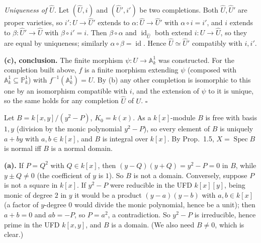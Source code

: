 \documentclass[11pt]{article}
\begin{document}
\emph{Uniqueness of $\hat U$.} Let $(\hat U,i)$ and $(\hat U',i')$ be two completions. Both $\hat U,\hat U'$ are proper varieties, so $i':U\to\hat U'$ extends to $\alpha:\hat U\to\hat U'$ with $\alpha\circ i=i'$, and $i$ extends to $\beta:\hat U'\to\hat U$ with $\beta\circ i'=i$. Then $\beta\circ\alpha$ and $\operatorname{id}_{\hat U}$ both extend $i:U\to\hat U$, so they are equal by uniqueness; similarly $\alpha\circ\beta=\operatorname{id}$. Hence $\hat U\simeq\hat U'$ compatibly with $i,i'$.

\textbf{(c), conclusion.} The finite morphism $\psi:U\to\mathbb A^1_k$ was constructed. For the completion built above, $f$ is a finite morphism extending $\psi$ (composed with $\mathbb A^1_k\subseteq\mathbb P^1_k$) with $f^{-1}(\mathbb A^1_k)=U$. By (b) any other completion is isomorphic to this one by an isomorphism compatible with $i$, and the extension of $\psi$ to it is unique, so the same holds for any completion $\hat U$ of $U$. \hfill$\square$

\pf
Let $B=k[x,y]/(y^2-P)$, $K_0=k(x)$. As a $k[x]$-module $B$ is free with basis $1,y$ (division by the monic polynomial $y^2-P$), so every element of $B$ is uniquely $a+by$ with $a,b\in k[x]$, and $B$ is integral over $k[x]$. By Prop.~1.5, $X=\operatorname{Spec}B$ is normal iff $B$ is a normal domain.

\textbf{(a).} If $P=Q^2$ with $Q\in k[x]$, then $(y-Q)(y+Q)=y^2-P=0$ in $B$, while $y\pm Q\neq0$ (the coefficient of $y$ is $1$). So $B$ is not a domain. Conversely, suppose $P$ is not a square in $k[x]$. If $y^2-P$ were reducible in the UFD $k[x][y]$, being monic of degree $2$ in $y$ it would be a product $(y-a)(y-b)$ with $a,b\in k[x]$ (a factor of $y$-degree $0$ would divide the monic polynomial, hence be a unit); then $a+b=0$ and $ab=-P$, so $P=a^2$, a contradiction. So $y^2-P$ is irreducible, hence prime in the UFD $k[x,y]$, and $B$ is a domain. (We also need $B\ne0$, which is clear.)
\end{document}

